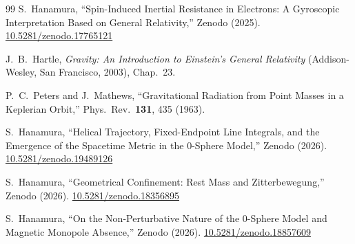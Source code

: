 \documentclass[%
 reprint, amsmath,amssymb, aps, prd, ]{revtex4-2}
\numberwithin{equation}{section}
\begin{document}
\begin{thebibliography}{99}
S.~Hanamura, ``Spin-Induced Inertial Resistance in Electrons: A Gyroscopic Interpretation Based on General Relativity,''
Zenodo (2025). \href{https://doi.org/10.5281/zenodo.17765121}{10.5281/zenodo.17765121}

J.~B.~Hartle, \textit{Gravity: An Introduction to Einstein's General Relativity}
(Addison-Wesley, San Francisco, 2003), Chap.~23.

P.~C.~Peters and J.~Mathews, ``Gravitational Radiation from Point Masses in a Keplerian Orbit,''
Phys.\ Rev.\ \textbf{131}, 435 (1963).

S.~Hanamura, ``Helical Trajectory, Fixed-Endpoint Line Integrals, and the
Emergence of the Spacetime Metric in the 0-Sphere Model,''
Zenodo (2026). \href{https://doi.org/10.5281/zenodo.19489126}{10.5281/zenodo.19489126}

S.~Hanamura, ``Geometrical Confinement: Rest Mass and Zitterbewegung,''
Zenodo (2026). \href{https://doi.org/10.5281/zenodo.18356895}{10.5281/zenodo.18356895}

S.~Hanamura, ``On the Non-Perturbative Nature of the 0-Sphere Model and Magnetic Monopole Absence,''
Zenodo (2026). \href{https://doi.org/10.5281/zenodo.18857609}{10.5281/zenodo.18857609}

\end{thebibliography}
\end{document}
